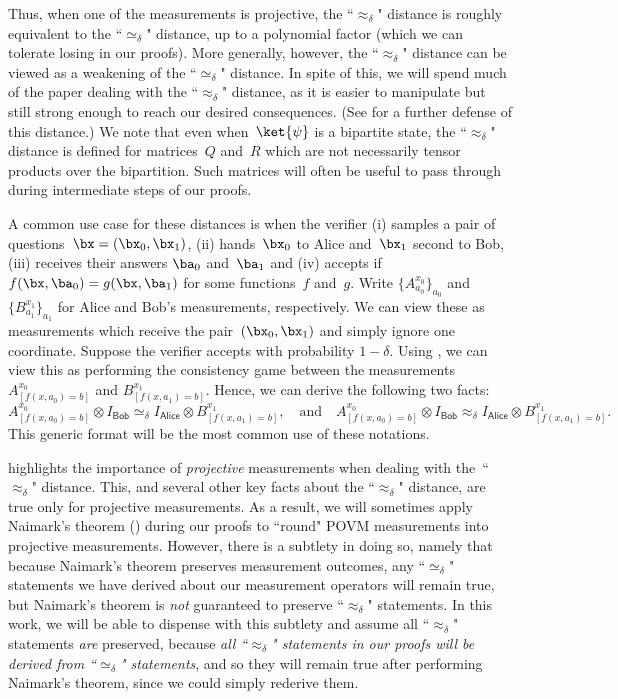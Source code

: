 \documentclass[11pt]{article}
\newcommand{\consistency}{\simeq}
\newcommand{\reg}[1]{{\mathsf{#1}}}
\begin{document}
Thus, when one of the measurements is projective,
the ``$\approx_\delta$" distance is roughly equivalent to the ``$\consistency_\delta$" distance,
up to a polynomial factor (which we can tolerate losing in our proofs).
More generally, however, the ``$\approx_\delta$" distance
can be viewed as a weakening of the ``$\consistency_\delta$" distance.
In spite of this, we will spend much of the paper dealing with the ``$\approx_\delta$" distance,
as it is easier to manipulate but still strong enough to reach our desired consequences.
(See \cite[Section~$2.3.1$]{Vid11} for a further defense of this distance.)
We note that even when~$\ket{\psi}$ is a bipartite state,
the ``$\approx_\delta$" distance is defined for matrices~$Q$ and~$R$
which are not necessarily tensor products over the bipartition.
Such matrices will often be useful to pass through during intermediate steps of our proofs.

A common use case for these distances is when the verifier (i) samples a pair of questions~$\bx = (\bx_0, \bx_1)$,
(ii) hands~$\bx_0$ to Alice and~$\bx_1$ second to Bob,
(iii) receives their answers $\ba_0$ and~$\ba_1$
and (iv) accepts if $f(\bx, \ba_0) = g(\bx, \ba_1)$ for some functions~$f$ and~$g$.
Write $\{A^{x_0}_{a_0}\}_{a_0}$ and $\{B^{x_1}_{a_1}\}_{a_1}$ for Alice and Bob's measurements, respectively.
We can view these as measurements which receive the pair~$(\bx_0, \bx_1)$ and simply ignore one coordinate.
Suppose the verifier accepts with probability $1-\delta$.
Using , we can view this as performing the consistency game
between the measurements $A^{x_0}_{[f(x, a_0) = b]}$ and  $B^{x_1}_{[f(x, a_1) = b]}$.
Hence, we can derive the following two facts:
\begin{equation*}
A^{x_0}_{[f(x, a_0) = b]} \otimes I_{\reg{Bob}}
\consistency_{\delta} I_{\reg{Alice}} \otimes B^{x_1}_{[f(x, a_1) = b]},
\quad
\text{and}
\quad
A^{x_0}_{[f(x, a_0) = b]} \otimes I_{\reg{Bob}}
\approx_{\delta} I_{\reg{Alice}} \otimes B^{x_1}_{[f(x, a_1) = b]}.
\end{equation*}
This generic format will be the most common use of these notations.

 highlights the importance of \emph{projective} measurements when dealing with the~``$\approx_\delta$" distance.
This, and several other key facts about the ``$\approx_\delta$" distance, are true only for projective measurements.
As a result, we will sometimes apply Naimark's theorem ()
during our proofs to ``round" POVM measurements into projective measurements.
However, there is a subtlety in doing so, namely that 
because Naimark's theorem preserves measurement outcomes,
any ``$\consistency_\delta$" statements we have derived about our measurement operators will remain true,
but Naimark's theorem is \emph{not} guaranteed to preserve ``$\approx_\delta$" statements.
In this work, we will be able to dispense with this subtlety and assume all ``$\approx_\delta$" statements \emph{are} preserved,
because \emph{all ``$\approx_\delta$" statements in our proofs will be derived from ``$\consistency_\delta$" statements},
and so they will remain true after performing Naimark's theorem, since we could simply rederive them.
\end{document}
